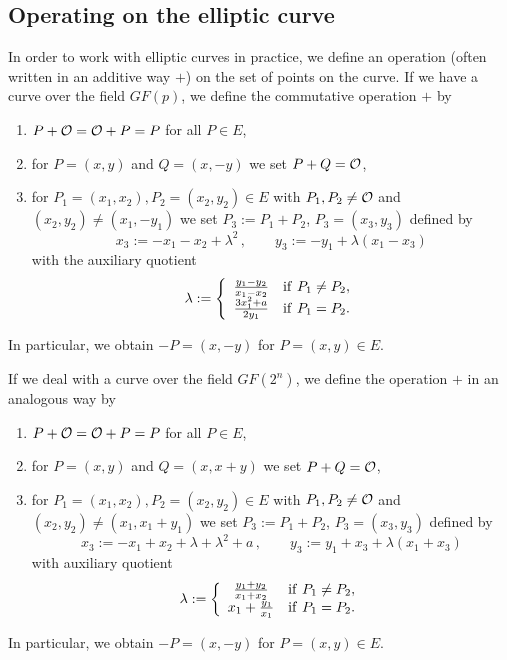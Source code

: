 \subsection{Operating on the elliptic curve}

In order to work with elliptic curves in practice, we define an operation (often written in an additive way $+$) on the set of points on the curve. If we have a curve over the field $GF(p)$, we define the commutative operation $+$ by
\begin{enumerate}
\item $P+{\cal O}={\cal O}+P=P$ for all $P\in E$,
\item for $P=(x,y)$ and $Q=(x,-y)$ we set $P+Q={\cal O}$,
\item for $P_1=(x_1,x_2),P_2=(x_2,y_2)\in E$ with $P_1,P_2\ne {\cal O}$ and $(x_2,y_2)\ne (x_1,-y_1)$ we set $P_3:=P_1+P_2$, $P_3=(x_3,y_3)$ defined by
$$ x_3:=-x_1-x_2+\lambda^2 \, , \qquad y_3:=-y_1+\lambda (x_1-x_3)
$$
with the auxiliary quotient
$$ \lambda:=\left\{ \begin{array}{cl} {y_1-y_2\over x_1-x_2} & {\rm if~} P_1\ne P_2, \\
                                     {3x_1^2+a\over 2y_1} & {\rm if~} P_1=P_2. \end{array} \right.
$$
\end{enumerate}
In particular, we obtain $-P=(x,-y)$ for $P=(x,y)\in E$.

If we deal with a curve over the field $GF(2^n)$, we define the operation $+$ in an analogous way by
\begin{enumerate}
\item $P+{\cal O}={\cal O}+P=P$ for all $P\in E$,
\item for $P=(x,y)$ and $Q=(x,x+y)$ we set $P+Q={\cal O}$,
\item for $P_1=(x_1,x_2),P_2=(x_2,y_2)\in E$ with $P_1,P_2\ne {\cal O}$ and $(x_2,y_2)\ne (x_1,x_1+y_1)$ we set $P_3:=P_1+P_2$, $P_3=(x_3,y_3)$ defined by
$$ x_3:=-x_1+x_2+\lambda+\lambda^2+a \, , \qquad y_3:=y_1+x_3+\lambda (x_1+x_3)
$$
with auxiliary quotient
$$ \lambda:=\left\{ \begin{array}{cl} {y_1+y_2\over x_1+x_2} & {\rm if~} P_1\ne P_2, \\
                                   x_1+{y_1\over x_1} & {\rm if~} P_1=P_2. \end{array}\right.
$$
\end{enumerate}
In particular, we obtain $-P=(x,-y)$ for $P=(x,y)\in E$.

